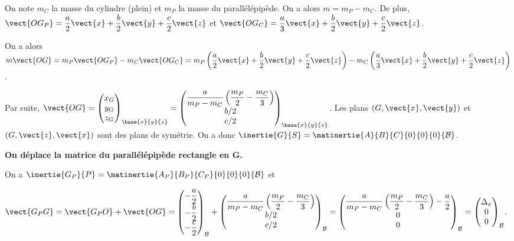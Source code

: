 \begin{corrigebox}
On note $m_C$ la masse du cylindre (plein) et $m_P$ la masse du parallélépipède. On a alors $m=m_P-m_C$.
De plus, $\vect{OG_P}=\dfrac{a}{2}\vect{x}+\dfrac{b}{2}\vect{y}+\dfrac{c}{2}\vect{z}$
et $\vect{OG_C}=\dfrac{a}{3}\vect{x}+\dfrac{b}{2}\vect{y}+\dfrac{c}{2}\vect{z}$.

On a alors 
$m \vect{OG}=m_P \vect{OG_P}-m_C \vect{OG_C} = m_P \left(\dfrac{a}{2}\vect{x}+\dfrac{b}{2}\vect{y}+\dfrac{c}{2}\vect{z} \right)-m_C \left( \dfrac{a}{3}\vect{x}+\dfrac{b}{2}\vect{y}+\dfrac{c}{2}\vect{z}\right) $.

Par suite, 
$\vect{OG}=
\begin{pmatrix}
x_G \\ y_G \\ z_G
\end{pmatrix}_{\base{x}{y}{z}}
=
\begin{pmatrix}
\dfrac{a}{m_P-m_C} \left( \dfrac{m_P}{2} -  \dfrac{m_C}{3}\right) \\
b/2 \\
c/2
\end{pmatrix}_{\base{x}{y}{z}}
$.
Les plans $(G,\vect{x},\vect{y})$ et $(G,\vect{z},\vect{x})$ sont des plans de symétrie. 
On a donc $\inertie{G}{S}=\matinertie{A}{B}{C}{0}{0}{0}{\mathcal{B}}$.

\textbf{On déplace la matrice du parallélépipède rectangle en G.}

On a $\inertie{G_P}{P}=\matinertie{A_P}{B_P}{C_P}{0}{0}{0}{\mathcal{B}}$ et

$\vect{G_P G} = \vect{G_P O} + \vect{O G} = 
\begin{pmatrix}
-\dfrac{a}{2} \\
-\dfrac{b}{2} \\
-\dfrac{c}{2}
\end{pmatrix}_{\mathcal{B}} 
+
\begin{pmatrix}
\dfrac{a}{m_P-m_C} \left( \dfrac{m_P}{2} -  \dfrac{m_C}{3}\right) \\
b/2 \\
c/2
\end{pmatrix}_{\mathcal{B}}=
\begin{pmatrix}
\dfrac{a}{m_P-m_C} \left( \dfrac{m_P}{2} -  \dfrac{m_C}{3}\right) -\dfrac{a}{2}\\
0 \\
0
\end{pmatrix}_{\mathcal{B}}=
\begin{pmatrix}
\Delta_x\\
0 \\
0
\end{pmatrix}_{\mathcal{B}}$.


\end{corrigebox}
